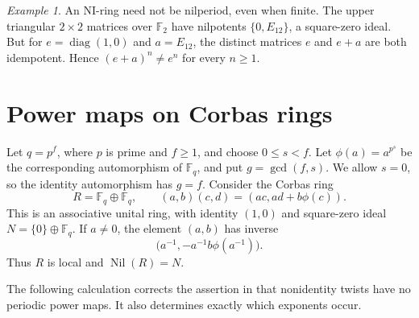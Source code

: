 \documentclass[11pt]{article}
\theoremstyle{remark}
\newtheorem{example}[theorem]{Example}
\DeclareMathOperator{\Nil}{Nil}
\begin{document}
\begin{example}
An NI-ring need not be nilperiod, even when finite. The upper triangular
$2\times2$ matrices over $\mathbb F_2$ have nilpotents
$\{0,E_{12}\}$, a square-zero ideal. But for $e=\operatorname{diag}(1,0)$
and $a=E_{12}$, the distinct matrices $e$ and $e+a$ are both idempotent.
Hence $(e+a)^n\ne e^n$ for every $n\geq1$.
\end{example}

\section{Power maps on Corbas rings}
Let $q=p^f$, where $p$ is prime and $f\geq1$, and choose $0\leq s<f$.
Let $\phi(a)=a^{p^s}$ be the corresponding automorphism of $\mathbb F_q$,
and put $g=\gcd(f,s)$. We allow $s=0$, so the identity automorphism has
$g=f$. Consider the Corbas ring
\begin{equation}\label{eq:corbas}
 R=\mathbb F_q\oplus\mathbb F_q,\qquad
 (a,b)(c,d)=(ac,ad+b\phi(c)).
\end{equation}
This is an associative unital ring, with identity $(1,0)$ and square-zero
ideal $N=\{0\}\oplus\mathbb F_q$. If $a\ne0$, the element $(a,b)$ has inverse
\[
 \bigl(a^{-1},-a^{-1}b\phi(a^{-1})\bigr).
\]
Thus $R$ is local and $\Nil(R)=N$.

The following calculation corrects the assertion in
\cite[Example~2.2 and Table~1]{Burnette} that nonidentity twists have no
periodic power maps. It also determines exactly which exponents occur.
\end{document}
